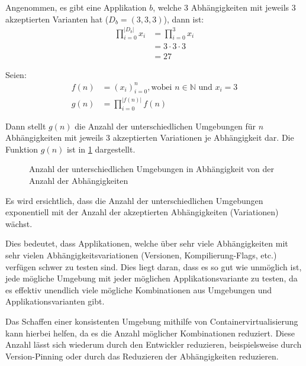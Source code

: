 Angenommen, es gibt eine Applikation $b$, welche 3 Abhängigkeiten mit jeweils 3 akzeptierten Varianten hat ($D_b = (3, 3, 3)$), dann ist: 
\begin{align*}
    \prod_{i=0}^{|D_b|} x_i &= \prod_{i=0}^{3} x_i\\
    &= 3 \cdot 3 \cdot 3 \\
    &= 27
\end{align*}

Seien:
\begin{align*}
    f(n) &= (x_i)_{i=0}^{n}, \text{wobei } n \in \mathbb{N} \text{ und } x_i = 3 \\
    g(n) &= \prod_{i=0}^{|f(n)|} f(n)
\end{align*}

\pagebreak

Dann stellt $g(n)$ die Anzahl der unterschiedlichen Umgebungen für $n$ Abhängigkeiten mit jeweils 3 akzeptierten Variationen je Abhängigkeit dar. Die Funktion $g(n)$ ist in \cref{fig:dependency-complexity} dargestellt.

\begin{figure}[H]
    \caption{Anzahl der unterschiedlichen Umgebungen in Abhängigkeit von der Anzahl der Abhängigkeiten}
    \label{fig:dependency-complexity}
\end{figure}


Es wird ersichtlich, dass die Anzahl der unterschiedlichen Umgebungen exponentiell mit der Anzahl der akzeptierten Abhängigkeiten (Variationen) wächst. 

Dies bedeutet, dass Applikationen, welche über sehr viele Abhängigkeiten mit sehr vielen Abhängigkeitsvariationen (Versionen, Kompilierung-Flags, etc.) verfügen schwer zu testen sind. Dies liegt daran, dass es so gut wie unmöglich ist, jede mögliche Umgebung mit jeder möglichen Applikationsvariante zu testen, da es effektiv unendlich viele mögliche Kombinationen aus Umgebungen und Applikationsvarianten gibt.

Das Schaffen einer konsistenten Umgebung mithilfe von Containervirtualisierung kann hierbei helfen, da es die Anzahl möglicher Kombinationen reduziert. Diese Anzahl lässt sich wiederum durch den Entwickler reduzieren, beispielsweise durch Version-Pinning oder durch das Reduzieren der Abhängigkeiten reduzieren.